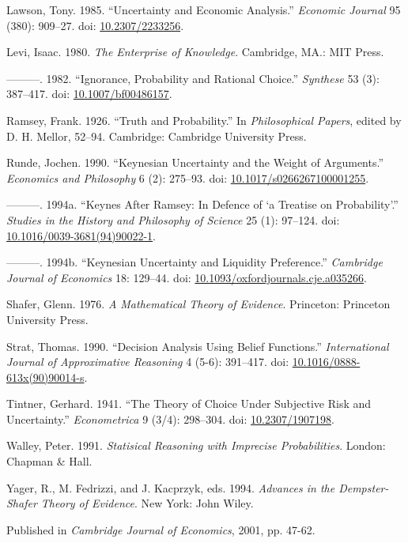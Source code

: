 \documentclass[
  11pt,
  letterpaper,
  DIV=11,
  numbers=noendperiod,
  twoside]{scrartcl}
\newlength{\cslhangindent}
\newenvironment{CSLReferences}[2] %
 {\begin{list}{}{%
  \setlength{\itemindent}{0pt}
  \setlength{\leftmargin}{0pt}
  \setlength{\parsep}{0pt}
  \ifodd #1
   \setlength{\leftmargin}{\cslhangindent}
   \setlength{\itemindent}{-1\cslhangindent}
  \fi
  \setlength{\itemsep}{#2\baselineskip}}}
 {\end{list}}
\begin{document}
\begin{CSLReferences}{1}{0}
Lawson, Tony. 1985. {``Uncertainty and Economic Analysis.''}
\emph{Economic Journal} 95 (380): 909--27. doi:
\href{https://doi.org/10.2307/2233256}{10.2307/2233256}.

Levi, Isaac. 1980. \emph{The Enterprise of Knowledge}. Cambridge, MA.:
MIT Press.

---------. 1982. {``Ignorance, Probability and Rational Choice.''}
\emph{Synthese} 53 (3): 387--417. doi:
\href{https://doi.org/10.1007/bf00486157}{10.1007/bf00486157}.

Ramsey, Frank. 1926. {``Truth and Probability.''} In \emph{Philosophical
Papers}, edited by D. H. Mellor, 52--94. Cambridge: Cambridge University
Press.

Runde, Jochen. 1990. {``Keynesian Uncertainty and the Weight of
Arguments.''} \emph{Economics and Philosophy} 6 (2): 275--93. doi:
\href{https://doi.org/10.1017/s0266267100001255}{10.1017/s0266267100001255}.

---------. 1994a. {``Keynes After Ramsey: In Defence of {`a Treatise on
Probability'}.''} \emph{Studies in the History and Philosophy of
Science} 25 (1): 97--124. doi:
\href{https://doi.org/10.1016/0039-3681(94)90022-1}{10.1016/0039-3681(94)90022-1}.

---------. 1994b. {``Keynesian Uncertainty and Liquidity Preference.''}
\emph{Cambridge Journal of Economics} 18: 129--44. doi:
\href{https://doi.org/10.1093/oxfordjournals.cje.a035266}{10.1093/oxfordjournals.cje.a035266}.

Shafer, Glenn. 1976. \emph{A Mathematical Theory of Evidence}.
Princeton: Princeton University Press.

Strat, Thomas. 1990. {``Decision Analysis Using Belief Functions.''}
\emph{International Journal of Approximative Reasoning} 4 (5-6):
391--417. doi:
\href{https://doi.org/10.1016/0888-613x(90)90014-s}{10.1016/0888-613x(90)90014-s}.

Tintner, Gerhard. 1941. {``The Theory of Choice Under Subjective Risk
and Uncertainty.''} \emph{Econometrica} 9 (3/4): 298--304. doi:
\href{https://doi.org/10.2307/1907198}{10.2307/1907198}.

Walley, Peter. 1991. \emph{Statisical Reasoning with Imprecise
Probabilities}. London: Chapman \& Hall.

Yager, R., M. Fedrizzi, and J. Kacprzyk, eds. 1994. \emph{Advances in
the Dempster- Shafer Theory of Evidence}. New York: John Wiley.

\end{CSLReferences}



\noindent Published in\emph{
Cambridge Journal of Economics}, 2001, pp. 47-62.
\end{document}
